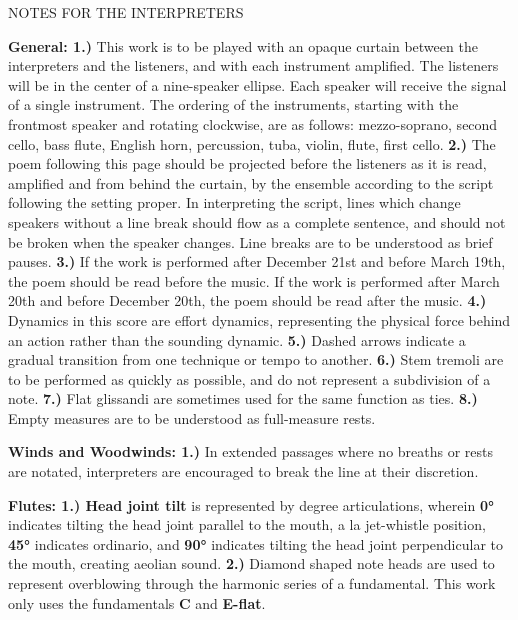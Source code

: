 \documentclass[11pt]{article}
\begin{document}
\vspace*{4\baselineskip}

\begingroup
\begin{center}
\huge NOTES FOR THE INTERPRETERS
\end{center}
\endgroup

\begingroup
\textbf{General: 1.)} This work is to be played with an opaque curtain between the interpreters and the listeners, and with each instrument amplified. The listeners will be in the center of a nine-speaker ellipse. Each speaker will receive the signal of a single instrument. The ordering of the instruments, starting with the frontmost speaker and rotating clockwise, are as follows: mezzo-soprano, second cello, bass flute, English horn, percussion, tuba, violin, flute, first cello. \textbf{2.)} The poem following this page should be projected before the listeners as it is read, amplified and from behind the curtain, by the ensemble according to the script following the setting proper. In interpreting the script, lines which change speakers without a line break should flow as a complete sentence, and should not be broken when the speaker changes. Line breaks are to be understood as brief pauses. \textbf{3.)} If the work is performed after December 21st and before March 19th, the poem should be read before the music. If the work is performed after March 20th and before December 20th, the poem should be read after the music. \textbf{4.)}  Dynamics in this score are effort dynamics, representing the physical force behind an action rather than the sounding dynamic. \textbf{5.)} Dashed arrows indicate a gradual transition from one technique or tempo to another. \textbf{6.)}  Stem tremoli are to be performed as quickly as possible, and do not represent a subdivision of a note. \textbf{7.)} Flat glissandi are sometimes used for the same function as ties. \textbf{8.)} Empty measures are to be understood as full-measure rests.
\endgroup

\begingroup
\textbf{Winds and Woodwinds: 1.)} In extended passages where no breaths or rests are notated, interpreters are encouraged to break the line at their discretion.
\endgroup

\begingroup
\textbf{Flutes: 1.) Head joint tilt} is represented by degree articulations, wherein \textbf{0°} indicates tilting the head joint parallel to the mouth, a la jet-whistle position, \textbf{45°} indicates ordinario, and \textbf{90°} indicates tilting the head joint perpendicular to the mouth, creating aeolian sound. \textbf{2.)} Diamond shaped note heads are used to represent overblowing through the harmonic series of a fundamental. This work only uses the fundamentals \textbf{C} and \textbf{E-flat}.
\endgroup
\end{document}
